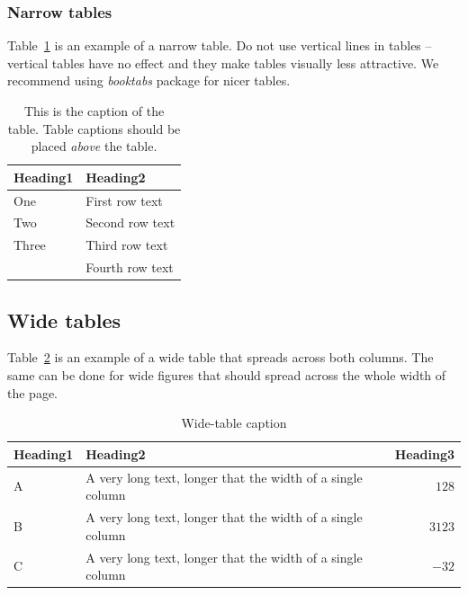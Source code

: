 \documentclass[10pt, a4paper]{article}
\begin{document}
\subsubsection{Narrow tables}

Table~\ref{tab:narrow-table} is an example of a narrow table.
Do not use vertical lines in tables -- vertical tables have no effect and they make tables visually less attractive.
We recommend using \textit{booktabs} package for nicer tables.

\begin{table}
\caption{This is the caption of the table. Table captions should be placed \textit{above} the table.}
\label{tab:narrow-table}
\begin{center}
\begin{tabular}{ll}
\toprule
Heading1 & Heading2 \\
\midrule
One & First row text \\
Two   & Second row text \\
Three   & Third row text \\
      & Fourth row text \\
\bottomrule
\end{tabular}
\end{center}
\end{table}

\subsection{Wide tables}

Table~\ref{tab:wide-table} is an example of a wide table that spreads across both columns.
The same can be done for wide figures that should spread across the whole width of the page.

\begin{table}
\caption{Wide-table caption}
\label{tab:wide-table}
\begin{center}
\begin{tabular}{llr}
\toprule
Heading1 & Heading2 & Heading3\\
\midrule
A & A very long text, longer that the width of a single column & $128$\\
B & A very long text, longer that the width of a single column & $3123$\\
C & A very long text, longer that the width of a single column & $-32$\\
\bottomrule
\end{tabular}
\end{center}
\end{table}
\end{document}
